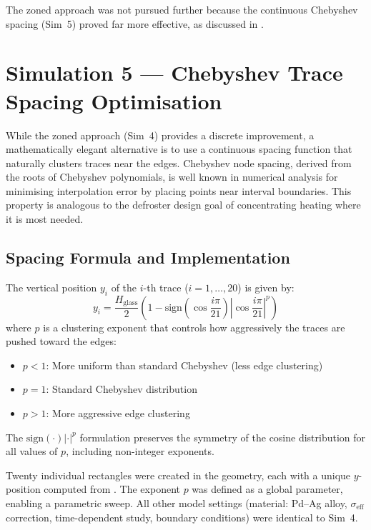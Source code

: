 The zoned approach was not pursued further because the continuous Chebyshev spacing (Sim~5) proved far more effective, as discussed in .


\section{Simulation 5 --- Chebyshev Trace Spacing Optimisation}
\label{sec:sim5}

While the zoned approach (Sim~4) provides a discrete improvement, a mathematically elegant alternative is to use a continuous spacing function that naturally clusters traces near the edges. Chebyshev node spacing, derived from the roots of Chebyshev polynomials, is well known in numerical analysis for minimising interpolation error by placing points near interval boundaries. This property is analogous to the defroster design goal of concentrating heating where it is most needed.

\subsection{Spacing Formula and Implementation}

The vertical position $y_i$ of the $i$-th trace ($i = 1, \ldots, 20$) is given by:
\begin{equation}
    y_i = \frac{H_\text{glass}}{2} \left(1 - \text{sign}\!\left(\cos\frac{i\pi}{21}\right) \left|\cos\frac{i\pi}{21}\right|^p\right)
    \label{eq:chebyshev}
\end{equation}
where $p$ is a clustering exponent that controls how aggressively the traces are pushed toward the edges:
\begin{itemize}
    \item $p < 1$: More uniform than standard Chebyshev (less edge clustering)
    \item $p = 1$: Standard Chebyshev distribution
    \item $p > 1$: More aggressive edge clustering
\end{itemize}

The $\text{sign}(\cdot)|\cdot|^p$ formulation preserves the symmetry of the cosine distribution for all values of $p$, including non-integer exponents.

Twenty individual rectangles were created in the geometry, each with a unique $y$-position computed from . The exponent $p$ was defined as a global parameter, enabling a parametric sweep. All other model settings (material: Pd--Ag alloy, $\sigma_\text{eff}$ correction, time-dependent study, boundary conditions) were identical to Sim~4.

